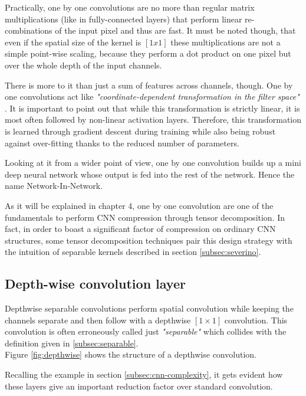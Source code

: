 Practically, one by one convolutions are no more than regular matrix multiplications (like in fully-connected layers) that perform linear re-combinations of the input pixel and thus are fast. It must be noted though, that even if the spatial size of the kernel is $[1x1]$ these multiplications are not a simple point-wise scaling, because they perform a dot product on one pixel but over the whole depth of the input channels. 
\newline 

There is more to it than just a sum of features across channels, though. One by one convolutions act like \emph{"coordinate-dependent transformation in the filter space"} \parencite{NIN}. It is important to point out that while this transformation is strictly linear, it is most often followed by non-linear activation layers. Therefore, this transformation is learned through gradient descent during training while also being robust against over-fitting thanks to the reduced number of parameters. 
\newline 

Looking at it from a wider point of view, one by one convolution builds up a mini deep neural network whose output is fed into the rest of the network. Hence the name Network-In-Network. 
\newline

As it will be explained in chapter 4, one by one convolution are one of the fundamentals to perform CNN compression through tensor decomposition. In fact, in order to boast a significant factor of compression on ordinary CNN structures, some tensor decomposition techniques pair this design strategy with the intuition of separable kernels described in section \ref{subsec:severino}.

\subsection{Depth-wise convolution layer}
\label{subsec:depthwise}
Depthwise separable convolutions perform spatial convolution while keeping the channels separate and then follow with a depthwise $[1 \times 1]$ convolution. This convolution is often erroneously called just \emph{"separable"} which collides with the definition given in \ref{subsec:separable}. 
\\

Figure \ref{fig:depthwise} shows the structure of a depthwise convolution. 

Recalling the example in section \ref{subsec:cnn-complexity}, it gets evident how these layers give an important reduction factor over standard convolution. 

